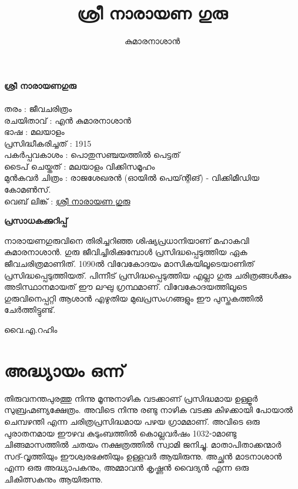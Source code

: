 \documentclass[12pt,openany]{book}
\title{\textbf{ശ്രീ നാരായണ ഗുരു}}
\author{കുമാരനാശാൻ}
\date{}
\begin{document}
	
	
	\newpage
	\thispagestyle{empty} 
	\mbox{}
	\maketitle
	\newpage
	
	\thispagestyle{empty}
	\textbf{{\LARGE ശ്രീ നാരായണഗുരു}}\\	
	\\
	തരം : ജീവചരിത്രം\\
	രചയിതാവ് : എൻ കുമാരനാശാൻ\\
	ഭാഷ : മലയാളം\\
	പ്രസിദ്ധീകരിച്ചത് : 1915\\
	പകർപ്പവകാശം : പൊതുസഞ്ചയത്തിൽ പെട്ടത്\\
	ടൈപ് ചെയ്തത് : മലയാളം വിക്കിസമൂഹം\\
	മുൻകവർ ചിത്രം : രാജശേഖരൻ (ഓയിൽ പെയ്‌ന്റിങ്) - വിക്കിമീഡിയ കോമൺസ്.\\
	വെബ് ലിങ്ക് : \href{https://ml.wikisource.org/wiki/%E0%B4%B6%E0%B5%8D%E0%B4%B0%E0%B5%80_%E0%B4%A8%E0%B4%BE%E0%B4%B0%E0%B4%BE%E0%B4%AF%E0%B4%A3_%E0%B4%97%E0%B5%81%E0%B4%B0%E0%B5%81}{ശ്രീ നാരായണ ഗുരു}
	
	\newpage
	
	\thispagestyle{empty}
	\begin{center}
		\textbf{{\LARGE പ്രസാധകക്കുറിപ്പ്}}
	\end{center}
	നാരായണഗുരുവിനെ തിരിച്ചറിഞ്ഞ ശിഷ്യപ്രധാനിയാണ് മഹാകവി കുമാരനാശാൻ. ഗുരു ജീവിച്ചിരിക്കുമ്പോൾ പ്രസിദ്ധപ്പെടുത്തിയ ഏക ജീവചരിത്രമാണിത്. 1090ൽ വിവേകോദയം മാസികയിലൂടെയാണിത് പ്രസിദ്ധപ്പെടുത്തിയത്. പിന്നീട് പ്രസിദ്ധപ്പെടുത്തിയ എല്ലാ ഗുരു ചരിത്രങ്ങൾക്കും അടിസ്ഥാനമായത് ഈ ലഘു ഗ്രന്ഥമാണ്. വിവേകോദയത്തിലൂടെ ഗുരുവിനെപ്പറ്റി ആശാൻ എഴുതിയ മുഖപ്രസംഗങ്ങളും ഈ പുസ്തകത്തിൽ ചേർത്തിട്ടുണ്ട്.
	
	
	\begin{flushright}
		വൈ.എ.റഹിം
	\end{flushright}
	
	\newpage
	\thispagestyle{empty}
	\mbox{}
	
	\newpage
	\chapter*{അദ്ധ്യായം ഒന്ന്}	
	തിരുവനന്തപുരത്തു നിന്നു മൂന്നുനാഴിക വടക്കാണ് പ്രസിദ്ധമായ ഉള്ളൂർ സുബ്രഹ്മണ്യക്ഷേത്രം. അവിടെ നിന്നു രണ്ടു നാഴിക വടക്കു കിഴക്കായി പോയാൽ ചെമ്പഴന്തി എന്ന ചരിത്രപ്രസിദ്ധമായ പഴയ ഗ്രാമമാണ്. അവിടെ ഒരു പുരാതനമായ ഈഴവ കുടുംബത്തിൽ കൊല്ലവർഷം 1032-ാമാണ്ടു ചിങ്ങമാസത്തിൽ ചതയം നക്ഷത്രത്തിൽ സ്വാമി ജനിച്ചു. മാതാപിതാക്കന്മാർ സദ്-വൃത്തിയും ഈശ്വരഭക്തിയും ഉള്ളവർ ആയിരുന്നു. അച്ഛൻ മാടനാശാൻ എന്ന ഒരു അദ്ധ്യാപകനും, അമ്മാവൻ കൃഷ്ണൻ വൈദ്യൻ എന്ന ഒരു ചികിത്സകനും ആയിരുന്നു.
	
\end{document}
